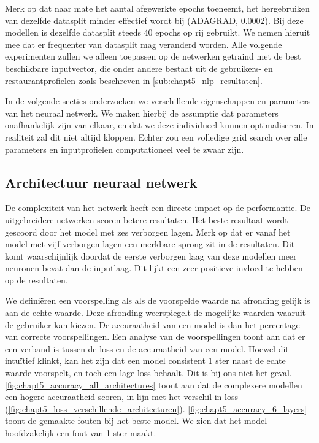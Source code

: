 Merk op dat naar mate het aantal afgewerkte epochs toeneemt, het hergebruiken van dezelfde datasplit minder effectief wordt bij (ADAGRAD, $0.0002$). Bij deze modellen is dezelfde datasplit steeds 40 epochs op rij gebruikt. We nemen hieruit mee dat er frequenter van datasplit mag veranderd worden.\newline
Alle volgende experimenten zullen we alleen toepassen op de netwerken getraind met de best beschikbare inputvector, die onder andere bestaat uit de gebruikers- en restaurantprofielen zoals beschreven in \autoref{sub:chapt5_nlp_resultaten}.

In de volgende secties onderzoeken we verschillende eigenschappen en parameters van het neuraal netwerk. We maken hierbij de assumptie dat parameters onafhankelijk zijn van elkaar, en dat we deze individueel kunnen optimaliseren. In realiteit zal dit niet altijd kloppen. Echter zou een volledige grid search over alle parameters en inputprofielen computationeel veel te zwaar zijn.

\subsection{Architectuur neuraal netwerk}
De complexiteit van het netwerk heeft een directe impact op de performantie. De uitgebreidere netwerken scoren betere resultaten. Het beste resultaat wordt gescoord door het model met zes verborgen lagen. Merk op dat er vanaf het model met vijf verborgen lagen een merkbare sprong zit in de resultaten. Dit komt waarschijnlijk doordat de eerste verborgen laag van deze modellen meer neuronen bevat dan de inputlaag. Dit lijkt een zeer positieve invloed te hebben op de resultaten.


We definiëren een voorspelling als  als de voorspelde waarde na afronding gelijk is aan de echte waarde. Deze afronding weerspiegelt de mogelijke waarden waaruit de gebruiker kan kiezen. De accuraatheid van een model is dan het percentage van correcte voorspellingen. Een analyse van de voorspellingen toont aan dat er een verband is tussen de loss en de accuraatheid van een model. Hoewel dit intuïtief klinkt, kan het zijn dat een model consistent 1 ster naast de echte waarde voorspelt, en toch een lage loss behaalt. Dit is bij ons niet het geval. \autoref{fig:chapt5_accuracy_all_architectures} toont aan dat de complexere modellen een hogere accuraatheid scoren, in lijn met het verschil in loss (\autoref{fig:chapt5_loss_verschillende_architecturen}). \autoref{fig:chapt5_accuracy_6_layers} toont de gemaakte fouten bij het beste model. We zien dat het model hoofdzakelijk een fout van 1 ster maakt.

